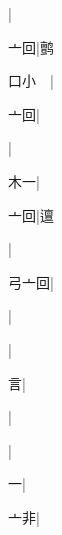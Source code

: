 \begin{multicols}{2}
{{}|{}\par
{\cjk{}{\cnsym{}　}亠回}|{\cjk{}鹯}\par
{\cjk{}口小{\cnsym{}　}}|{}\par
{亠回}|{}\par
{\cjk{}{\cnsym{}　}{\cnsym{}　}{\cnsym{}　}}|{}\par
{\cjk{}{\cnsym{}　}木一}|{}\par
{\cjk{}{\cnsym{}　}亠回}|{\cjk{}邅}\par
{\cjk{}{\cnsym{}　}{\cnsym{}　}{\cnsym{}　}}|{}\par
{\cjk{}弓亠回}|{}\par
{}|{}\par
{\cjk{}{\cnsym{}　}{\cnsym{}　}{\cnsym{}　}}|{}\par
{\cjk{}{\cnsym{}　}{\cnsym{}　}言}|{}\par
{}|{}\par
{\cjk{}{\cnsym{}　}{\cnsym{}　}{\cnsym{}　}}|{}\par
{\cjk{}{\cnsym{}　}{\cnsym{}　}一}|{}\par
{\cjk{}{\cnsym{}　}亠非}|{}\par
}
\end{multicols}
